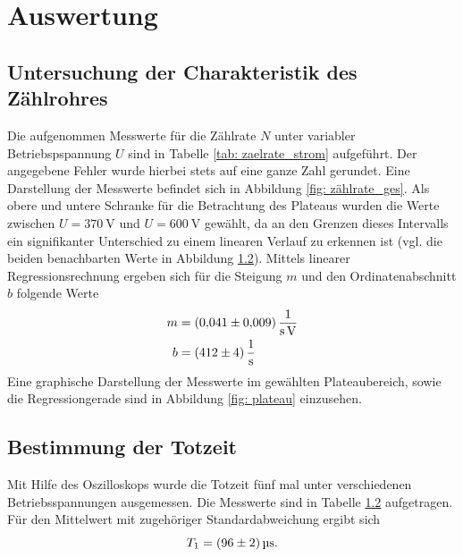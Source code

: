 \section{Auswertung}


\subsection{Untersuchung der Charakteristik des Zählrohres}
Die aufgenommen Messwerte für die Zählrate $N$ unter variabler Betriebspspannung $U$ sind
in Tabelle \ref{tab: zaelrate_strom} aufgeführt. Der angegebene Fehler wurde hierbei stets
auf eine ganze Zahl gerundet. Eine Darstellung der Messwerte befindet sich in Abbildung \ref{fig: zählrate_ges}.
Als obere und untere Schranke für die Betrachtung des Plateaus wurden die Werte zwischen $U = \SI{370}{\volt}$
und $U = \SI{600}{\volt}$ gewählt, da an den Grenzen dieses Intervalls ein signifikanter Unterschied zu einem
linearen Verlauf zu erkennen ist (vgl. die beiden benachbarten Werte in Abbildung \ref{}). Mittels linearer
Regressionsrechnung ergeben sich für die Steigung $m$ und den Ordinatenabschnitt $b$ folgende Werte
\begin{align}
  m &= \SI{0.041 \pm 0.009}{\per\second\per\volt} \\
  b &= \SI{412 \pm 4}{\per\second}
\end{align}
Eine graphische Darstellung der Messwerte im gewählten Plateaubereich, sowie die Regressiongerade sind in
Abbildung \ref{fig: plateau} einzusehen.

\subsection{Bestimmung der Totzeit}
Mit Hilfe des Oszilloskops wurde die Totzeit fünf mal unter verschiedenen Betriebsspannungen ausgemessen. Die Messwerte
sind in Tabelle \ref{} aufgetragen. Für den Mittelwert mit zugehöriger Standardabweichung ergibt sich
\begin{equation}
  T_1 = \SI{96 \pm 2}{\micro\second}.
\end{equation}






